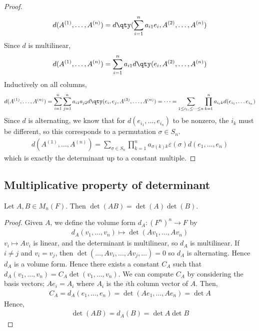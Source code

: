 \begin{proof}
	\begin{align*}
		d(A^{(1)}, \dots, A^{(n)}) = d\qty(\sum_{i=1}^n a_{i1} e_i, A^{(2)}, \dots, A^{(n)})
	\end{align*}
	Since $d$ is multilinear,
	\begin{align*}
		d(A^{(1)}, \dots, A^{(n)}) = \sum_{i=1}^n a_{i1} d\qty(e_i, A^{(2)}, \dots, A^{(n)})
	\end{align*}
	Inductively on all columns,
	\begin{align*}
		d(A^{(1)}, \dots, A^{(n)}) = \sum_{i=1}^n \sum_{j=1}^n a_{i1} a_{j2} d\qty(e_i, e_j, A^{(3)}, \dots, A^{(n)}) = \dots = \sum_{1 \leq i_1, \leq \dots \leq n} \prod_{k=1}^n a_{i_\ell k} d(e_{i_1}, \dots e_{i_n})
	\end{align*}
	Since $d$ is alternating, we know that for $d(e_{i_1}, \dots, e_{i_n})$ to be nonzero, the $i_k$ must be different, so this corresponds to a permutation $\sigma \in S_n$.
	\begin{align*}
		d(A^{(1)}, \dots, A^{(n)}) = \sum_{\sigma \in S_n} \prod_{k=1}^n a_{\sigma(k) k} \varepsilon(\sigma) d(e_1, \dots, e_n)
	\end{align*}
	which is exactly the determinant up to a constant multiple.
\end{proof}

\subsection{Multiplicative property of determinant}
\begin{lemma}
	Let $A, B \in M_n(F)$.
	Then $\det(AB) = \det(A) \det(B)$.
\end{lemma}
\begin{proof}
	Given $A$, we define the volume form $d_A \colon (F^n)^n \to F$ by
	\begin{align*}
		d_A(v_1, \dots, v_n) \mapsto \det(A v_1, \dots, A v_n)
	\end{align*}
	$v_i \mapsto A v_i$ is linear, and the determinant is multilinear, so $d_A$ is multilinear.
	If $i \neq j$ and $v_i = v_j$, then $\det(\dots, A v_i, \dots, A v_j, \dots) = 0$ so $d_A$ is alternating.
	Hence $d_A$ is a volume form.
	Hence there exists a constant $C_A$ such that $d_A(v_1, \dots, v_n) = C_A \det(v_1, \dots, v_n)$.
	We can compute $C_A$ by considering the basis vectors; $A e_i = A_i$ where $A_i$ is the $i$th column vector of $A$.
	Then,
	\begin{align*}
		C_A = d_A(e_1, \dots, e_n) = \det(Ae_1, \dots, Ae_n) = \det A
	\end{align*}
	Hence,
	\begin{align*}
		\det(AB) = d_A(B) = \det A \det B
	\end{align*}
\end{proof}

